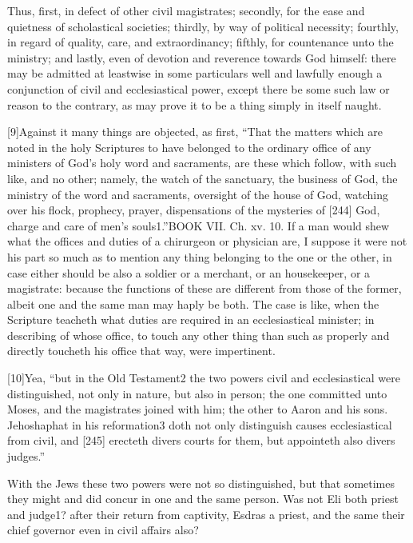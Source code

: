 Thus, first, in defect of other civil magistrates; secondly, for the ease and quietness of scholastical societies; thirdly, by way of political necessity; fourthly, in regard of quality, care, and extraordinancy; fifthly, for countenance unto the ministry; and lastly, even of devotion and reverence towards God himself: there may be admitted at leastwise in some particulars well and lawfully enough a conjunction of civil and ecclesiastical power, except there be some such law or reason to the contrary, as may prove it to be a thing simply in itself naught.

[9]Against it many things are objected, as first, “That the matters which are noted in the holy Scriptures to have belonged to the ordinary office of any ministers of God’s holy word and sacraments, are these which follow, with such like, and no other; namely, the watch of the sanctuary, the business of God, the ministry of the word and sacraments, oversight of the house of God, watching over his flock, prophecy, prayer, dispensations of the mysteries of [244] God, charge and care of men’s souls1.”BOOK VII. Ch. xv. 10. If a man would shew what the offices and duties of a chirurgeon or physician are, I suppose it were not his part so much as to mention any thing belonging to the one or the other, in case either should be also a soldier or a merchant, or an housekeeper, or a magistrate: because the functions of these are different from those of the former, albeit one and the same man may haply be both. The case is like, when the Scripture teacheth what duties are required in an ecclesiastical minister; in describing of whose office, to touch any other thing than such as properly and directly toucheth his office that way, were impertinent.

[10]Yea, “but in the Old Testament2 the two powers civil and ecclesiastical were distinguished, not only in nature, but also in person; the one committed unto Moses, and the magistrates joined with him; the other to Aaron and his sons. Jehoshaphat in his reformation3 doth not only distinguish causes ecclesiastical from civil, and [245] erecteth divers courts for them, but appointeth also divers judges.”

With the Jews these two powers were not so distinguished, but that sometimes they might and did concur in one and the same person. Was not Eli both priest and judge1? after their return from captivity, Esdras a priest, and the same their chief governor even in civil affairs also?

